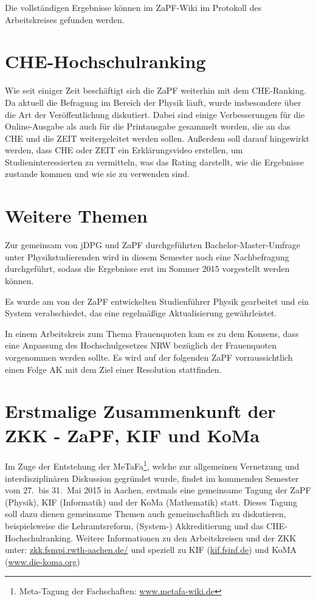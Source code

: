 \documentclass{scrartcl}
\begin{document}
Die vollständigen Ergebnisse können im ZaPF-Wiki im Protokoll des Arbeitskreises gefunden werden.

\section*{CHE-Hochschulranking}
Wie seit einiger Zeit beschäftigt sich die ZaPF weiterhin mit dem CHE-Ranking. Da aktuell die Befragung im Bereich der Physik läuft, wurde insbesondere über die Art der Veröffentlichung diskutiert. Dabei sind einige  Verbesserungen für die Online-Ausgabe als auch  für die  Printausgabe gesammelt worden, die an das CHE und die ZEIT weitergeleitet werden sollen. Außerdem soll darauf hingewirkt werden, dass CHE oder ZEIT ein Erklärungsvideo erstellen, um Studieninteressierten zu vermitteln, was das Rating darstellt, wie die Ergebnisse zustande kommen und wie sie zu verwenden sind.

\section*{Weitere Themen}

Zur gemeinsam von jDPG und ZaPF durchgeführten Bachelor-Master-Umfrage unter Physikstudierenden wird in diesem Semester noch eine Nachbefragung durchgeführt, sodass die Ergebnisse erst im Sommer 2015 vorgestellt werden können.

Es wurde am von der ZaPF entwickelten Studienführer Physik gearbeitet und ein System verabschiedet, das eine regelmäßige Aktualisierung gewährleistet.

In einem Arbeitskreis zum Thema Frauenquoten kam es zu dem Konsens, dass eine Anpassung des Hochschulgesetzes NRW bezüglich der Frauenquoten vorgenommen werden sollte. Es wird auf der folgenden ZaPF vorraussichtlich einen Folge AK mit dem Ziel einer Resolution stattfinden.


\section*{Erstmalige Zusammenkunft der ZKK - ZaPF, KIF und KoMa}
Im Zuge der Entstehung der MeTaFa\footnote{Meta-Tagung der Fachschaften: \href{http://metafa-wiki.de}{\url{www.metafa-wiki.de}}}, welche zur allgemeinen  Vernetzung und interdisziplinären Diskussion gegründet wurde, findet im kommenden Semester  vom 27.\ bis 31.\ Mai 2015 in Aachen, erstmals eine gemeinsame Tagung der  ZaPF (Physik), KIF (Informatik) und der KoMa (Mathematik) statt. Dieses Tagung soll dazu dienen gemeinsame Themen auch gemeinschaftlich zu diskutieren, beispielsweise die Lehramtsreform, (System-) Akkreditierung und das CHE-Hochschulranking. 
Weitere Informationen zu den Arbeitskreisen und der ZKK unter: \href{zkk.fsmpi.rwth-aachen.de/}{\url{zkk.fsmpi.rwth-aachen.de/}} und speziell zu KIF (\href{https://kif.fsinf.de}{\url{kif.fsinf.de}}) und KoMA (\href{http://www.die-koma.org/}{\url{www.die-koma.org}})
\end{document}
